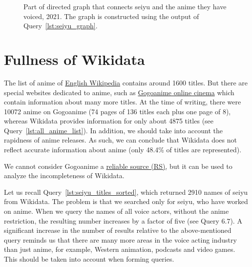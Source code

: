 \begin{figure*}

    \setlength{\fboxsep}{0pt}%
    \setlength{\fboxrule}{1pt}%
	\caption[Part of directed graph that connects seiyu to anime they have voiced, 2021.]{Part of directed graph that connects seiyu and the anime they have voiced, 2021. The graph is constructed using the output of Query~\ref{lst:seiyu_graph}.}%
    \label{fig:Seiyu_graph_en}%
\end{figure*} 

\section{Fullness of Wikidata}

The list of anime of \href{https://w.wiki/4Xs4}{English Wikipedia} contains around \num{1600} titles. But there are special websites dedicated to anime, such as \href{https://www1.gogoanime.cm/}{Gogoanime online cinema} which contain information about many more titles. At the time of writing, there were \num{10072} anime on Gogoanime (\num{74} pages of \num{136} titles each plus one page of \num{8}), whereas Wikidata provides information for only about \num{4875} titles (see Query~\ref{lst:all_anime_list}). In addition, we should take into account the rapidness of anime releases. As such, we can conclude that Wikidata does not reflect accurate information about anime (only \num{48.4}\% of titles are represented).

We cannot consider Gogoanime a \href{https://w.wiki/Eiw}{reliable source (RS)}, but it can be used to analyze the incompleteness of Wikidata.

Let us recall Query~\protect\ref{lst:seiyu_titles_sorted}, which returned \num{2910} names of seiyu from Wikidata. The problem is that we searched only for seiyu, who have worked on anime. When we query the names of all voice actors, without the anime restriction, the resulting number increases by a factor of five (see Query 6.7). A significant increase in the number of results relative to the above-mentioned query reminds us that there are many more areas in the voice acting industry than just anime, for example, Western animation, podcasts and video games. This should be taken into account when forming queries.

